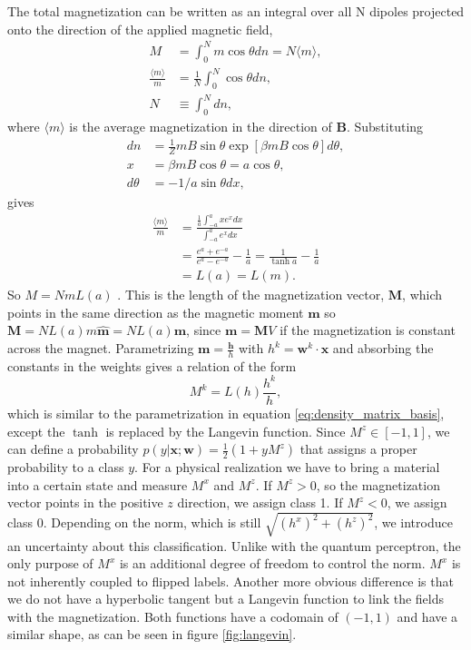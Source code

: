 \noindent The total magnetization can be written as an integral over all N dipoles projected onto the direction of the applied magnetic field,
\begin{align*}
    M  &= \int_0^N m \cos{\theta} dn = N\langle m \rangle,\\
    \frac{\langle m \rangle}{m} &= \frac{1}{N} \int_0^N \cos{\theta} dn,\\
    N &\equiv \int_0^N dn,
\end{align*}
where $\langle m \rangle$ is the average magnetization in the direction of $\mathbf{B}$. Substituting 
\begin{align*}
    dn &= \frac{1}{Z}mB\sin{\theta} \exp[\beta mB\cos{\theta}]d\theta,\\
    x &=\beta mB\cos{\theta} = a \cos{\theta},\\
    d\theta &= -1 / a\sin{\theta} dx,
\end{align*}
gives
\begin{align*}
    \frac{\langle m \rangle}{m} &= \frac{\frac{1}{a}\int^a_{-a} x e^x dx}{\int^a_{-a} e^x dx}\\
    &= \frac{e^a + e^{-a}}{e^a - e^{-a}} - \frac{1}{a} = \frac{1}{\tanh{a}} - \frac{1}{a} \\
    &= L(a) = L(m).
\end{align*}
So $M=N m L(a)$ \cite{Lidzey2019}. This is the length of the magnetization vector, $\mathbf{M}$, which points in the same direction as the magnetic moment $\mathbf{m}$ so $\mathbf{M} =  N L(a) m \hat{\mathbf{m}} =  N L(a) \mathbf{m}$, since $\mathbf{m} =  \mathbf{M} V$ if the magnetization is constant across the magnet. Parametrizing $\mathbf{m} = \frac{\mathbf{h}}{h}$ with $h^k = \mathbf{w}^k\cdot \mathbf{x}$ and absorbing the constants in the weights gives a relation of the form
\begin{equation*}
    M^k = L(h) \frac{h^k}{h},
\end{equation*}
which is similar to the parametrization in equation \ref{eq:density_matrix_basis}, except the $\tanh$ is replaced by the Langevin function. Since $M^z \in [-1,1]$, we can define a probability $p(y|\mathbf{x};\mathbf{w}) = \frac{1}{2}(1+y M^z)$ that assigns a proper probability to a class $y$. For a physical realization we have to bring a material into a certain state and measure $M^x$ and $M^z$. If $M^z>0$, so the magnetization vector points in the positive $z$ direction, we assign class 1.  If $M^z<0$, we assign class 0. Depending on the norm, which is still $\sqrt{(h^x)^2+(h^z)^2}$, we introduce an uncertainty about this classification. Unlike with the quantum perceptron, the only purpose of $M^x$ is an additional degree of freedom to control the norm. $M^x$ is not inherently coupled to flipped labels. Another more obvious difference is that we do not have a hyperbolic tangent but a Langevin function to link the fields with the magnetization. Both functions  have a codomain of $(-1,1)$ and have a similar shape, as can be seen in figure \ref{fig:langevin}.
